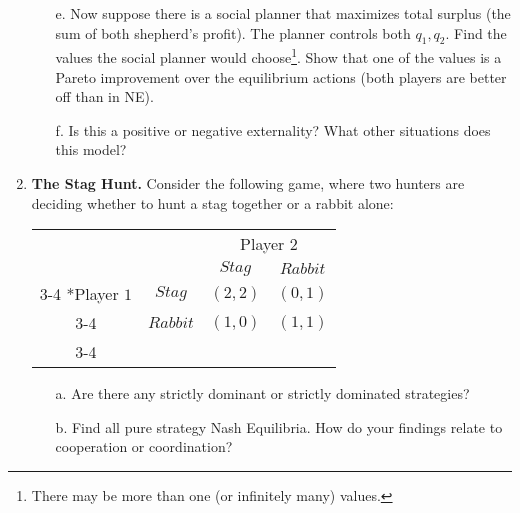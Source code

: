 \documentclass{article}
\begin{document}
\begin{enumerate}
\begin{enumerate}
        \vspace{5cm}
        
        
        \item[e.] Now suppose there is a social planner that maximizes total surplus (the sum of both shepherd's profit). The planner controls both $q_1, q_2$. Find the values the social planner would choose\footnote{There may be more than one (or infinitely many) values.}. Show that one of the values is a Pareto improvement over the equilibrium actions (both players are better off than in NE).
        
        \vspace{6cm}
        
        
        \item[f.] Is this a positive or negative externality? What other situations does this model?
        
        \vspace{4cm}
        
        \end{enumerate}
        \item \textbf{The Stag Hunt.} Consider the following game, where two hunters are deciding whether to hunt a stag together or a rabbit alone:
                    \begin{table}[H]
    \begin{tabular}{cc|c|c|}
      & \multicolumn{1}{c}{} & \multicolumn{2}{c}{Player $2$}\\
      & \multicolumn{1}{c}{} & \multicolumn{1}{c}{$Stag$}  & \multicolumn{1}{c}{$Rabbit$} \\\cline{3-4}
      \multirow{3}*{Player $1$}  & $Stag$ & $(2,2)$ & $(0,1)$ \\\cline{3-4}
      & $Rabbit$ & $(1,0)$ & $(1,1)$ \\\cline{3-4}
    \end{tabular}
      \end{table}
      \begin{enumerate}
          \item[a.] Are there any strictly dominant or strictly dominated strategies?
          
          \vspace{4cm}
          
          \item[b.] Find all pure strategy Nash Equilibria. How do your findings relate to cooperation or coordination?
          
          \vspace{6cm}
          

\end{enumerate}
\end{enumerate}
\end{document}
